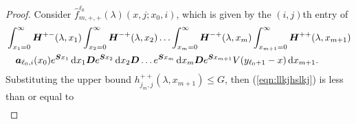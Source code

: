 \begin{proof}
	Consider \(\widehat f^{\ell_0}_{m,+,+}(\lambda)(x,j;x_0,i) \), which is given by the \((i,j)\)th entry of
        \begin{align}
	&\int_{x_1=0}^\infty \boldsymbol H^{+-}(\lambda,x_1)\nonumber
	\int_{x_2=0}^\infty \boldsymbol H^{-+}(\lambda,x_2) 
	\hdots \int_{x_m=0}^\infty \boldsymbol H^{-+}(\lambda, x_m) 
	\int_{x_{m+1}=0}^\infty \boldsymbol H^{++}(\lambda,x_{m+1}) 
	\\&\quad\boldsymbol   a_{\ell_0,i}(x_0)e^{\boldsymbol{S}x_1}\, \mathrm{d} x_1 \boldsymbol{D}e^{\boldsymbol{S}x_2} \, \mathrm{d} x_2 \boldsymbol{D}\dots e^{\boldsymbol{S}x_m} \, \mathrm{d} x_m \boldsymbol{D}e^{\boldsymbol{S}x_{m+1}}V(y_{\ell_0+1}-x) \, \mathrm{d} x_{m+1}. \label{eqn:llkjhslkj}
\end{align}
	Substituting the upper bound \(h^{++}_{j_m,j}(\lambda,x_{m+1})\leq G\), then (\ref{eqn:llkjhslkj}) is less than or equal to 
	\begin{align}

\end{align}
\end{proof}
